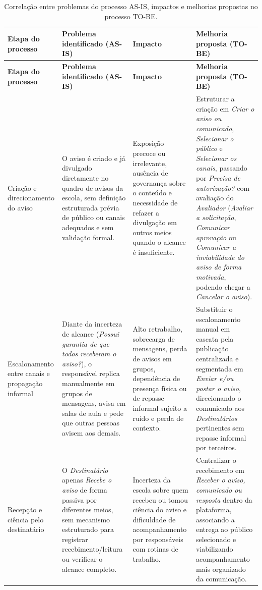 \documentclass[a4paper,12pt]{report}
\begin{document}
\begin{longtable}{|p{3.0cm}|p{3.8cm}|p{3.8cm}|p{4.2cm}|}
\caption{Correlação entre problemas do processo AS-IS, impactos e melhorias propostas no processo TO-BE.} \label{tab:melhorias-processo} \\
\hline
\textbf{Etapa do processo} & \textbf{Problema identificado (AS-IS)} & \textbf{Impacto} & \textbf{Melhoria proposta (TO-BE)} \\
\hline
\endfirsthead
\hline
\textbf{Etapa do processo} & \textbf{Problema identificado (AS-IS)} & \textbf{Impacto} & \textbf{Melhoria proposta (TO-BE)} \\
\hline
\endhead
Criação e direcionamento do aviso & O aviso é criado e já divulgado diretamente no quadro de avisos da escola, sem definição estruturada prévia de público ou canais adequados e sem validação formal. & Exposição precoce ou irrelevante, ausência de governança sobre o conteúdo e necessidade de refazer a divulgação em outros meios quando o alcance é insuficiente. & Estruturar a criação em \textit{Criar o aviso ou comunicado}, \textit{Selecionar o público} e \textit{Selecionar os canais}, passando por \textit{Precisa de autorização?} com avaliação do \textit{Avaliador} (\textit{Avaliar a solicitação}, \textit{Comunicar aprovação} ou \textit{Comunicar a inviabilidade do aviso de forma motivada}, podendo chegar a \textit{Cancelar o aviso}). \\
\hline
Escalonamento entre canais e propagação informal & Diante da incerteza de alcance (\textit{Possui garantia de que todos receberam o aviso?}), o responsável replica manualmente em grupos de mensagens, avisa em salas de aula e pede que outras pessoas avisem aos demais. & Alto retrabalho, sobrecarga de mensagens, perda de avisos em grupos, dependência de presença física ou de repasse informal sujeito a ruído e perda de contexto. & Substituir o escalonamento manual em cascata pela publicação centralizada e segmentada em \textit{Enviar e/ou postar o aviso}, direcionando o comunicado aos \textit{Destinatários} pertinentes sem repasse informal por terceiros. \\
\hline
Recepção e ciência pelo destinatário & O \textit{Destinatário} apenas \textit{Recebe o aviso} de forma passiva por diferentes meios, sem mecanismo estruturado para registrar recebimento/leitura ou verificar o alcance completo. & Incerteza da escola sobre quem recebeu ou tomou ciência do aviso e dificuldade de acompanhamento por responsáveis com rotinas de trabalho. & Centralizar o recebimento em \textit{Receber o aviso, comunicado ou resposta} dentro da plataforma, associando a entrega ao público selecionado e viabilizando acompanhamento mais organizado da comunicação. \\

\end{longtable}
\end{document}
